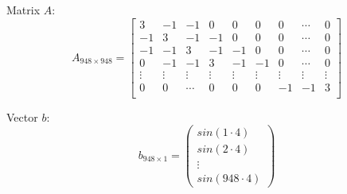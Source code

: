 \documentclass{article}
\begin{document}
Matrix $A$:
\[
A_{948 \times 948} = \begin{bmatrix}
    3 & -1 & -1 & 0 & 0 & 0 & 0 & \cdots & 0 \\
    -1 & 3 & -1 & -1 & 0 & 0 & 0 & \cdots & 0 \\
    -1 & -1 & 3 & -1 & -1 & 0 & 0 & \cdots & 0 \\
    0 & -1 & -1 & 3 & -1 & -1 & 0 & \cdots & 0 \\
    \vdots & \vdots & \vdots & \vdots & \vdots & \vdots & \vdots & \vdots & \vdots \\
    0 & 0 & \cdots & 0 & 0 & 0 & -1 & -1 & 3 \\

\end{bmatrix}
\]

Vector $b$:
\[
b_{948 \times 1} = \begin{pmatrix}
    sin(1 \cdot 4) \\
    sin(2 \cdot 4) \\
    \vdots \\
    sin(948 \cdot 4)
\end{pmatrix}
\]
\end{document}
